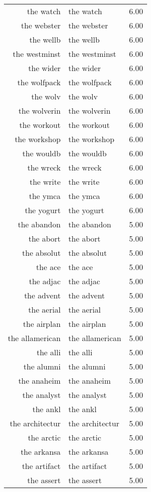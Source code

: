 \begin{table}[ht]
\begin{tabular}{rlr}
  the watch & the watch & 6.00 \\ 
  the webster & the webster & 6.00 \\ 
  the wellb & the wellb & 6.00 \\ 
  the westminst & the westminst & 6.00 \\ 
  the wider & the wider & 6.00 \\ 
  the wolfpack & the wolfpack & 6.00 \\ 
  the wolv & the wolv & 6.00 \\ 
  the wolverin & the wolverin & 6.00 \\ 
  the workout & the workout & 6.00 \\ 
  the workshop & the workshop & 6.00 \\ 
  the wouldb & the wouldb & 6.00 \\ 
  the wreck & the wreck & 6.00 \\ 
  the write & the write & 6.00 \\ 
  the ymca & the ymca & 6.00 \\ 
  the yogurt & the yogurt & 6.00 \\ 
  the abandon & the abandon & 5.00 \\ 
  the abort & the abort & 5.00 \\ 
  the absolut & the absolut & 5.00 \\ 
  the ace & the ace & 5.00 \\ 
  the adjac & the adjac & 5.00 \\ 
  the advent & the advent & 5.00 \\ 
  the aerial & the aerial & 5.00 \\ 
  the airplan & the airplan & 5.00 \\ 
  the allamerican & the allamerican & 5.00 \\ 
  the alli & the alli & 5.00 \\ 
  the alumni & the alumni & 5.00 \\ 
  the anaheim & the anaheim & 5.00 \\ 
  the analyst & the analyst & 5.00 \\ 
  the ankl & the ankl & 5.00 \\ 
  the architectur & the architectur & 5.00 \\ 
  the arctic & the arctic & 5.00 \\ 
  the arkansa & the arkansa & 5.00 \\ 
  the artifact & the artifact & 5.00 \\ 
  the assert & the assert & 5.00 \\ 

\end{tabular}
\end{table}
